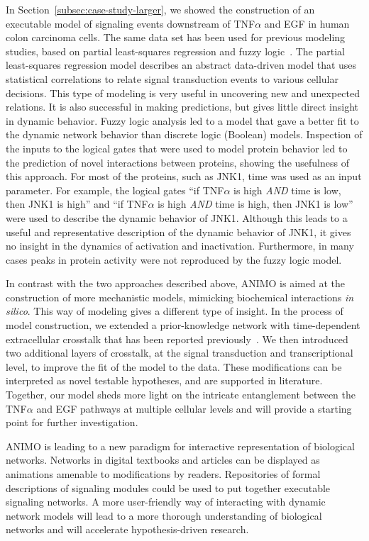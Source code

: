 In Section~\ref{subsec:case-study-larger}, we showed the construction of an executable model
of signaling events downstream of
TNF$\alpha$ and EGF in human colon carcinoma cells. The same data set has been used for
previous modeling studies, based on partial least-squares regression and fuzzy logic~\citep{pathway-leastsquare,pathway-fuzzy}.
The partial least-squares regression model describes an abstract data-driven model that uses statistical correlations
to relate signal transduction events to various cellular decisions. This type of modeling is
very useful in uncovering new and unexpected relations. It is also successful in making
predictions, but gives little direct insight in dynamic behavior. Fuzzy
logic analysis led to a model that gave a better fit to the dynamic network behavior than
discrete logic (Boolean) models. Inspection of the inputs to the logical gates that were used
to model protein behavior led to the prediction of novel interactions between proteins,
showing the usefulness of this approach. For most of the proteins, such as JNK1, time was
used as an input parameter. For example, the logical gates ``if TNF$\alpha$ is high
\emph{AND} time is low, then JNK1 is high'' and ``if TNF$\alpha$ is high \emph{AND} time is
high, then JNK1 is low'' were used to
describe the dynamic behavior of JNK1. Although this leads to a useful and representative
description of the dynamic behavior of JNK1, it gives no insight in the dynamics
of activation and inactivation. Furthermore, in many cases peaks in protein activity were
not reproduced by the fuzzy logic model.

In contrast with the two approaches described above, ANIMO is aimed at the construction of
more mechanistic models, mimicking biochemical interactions \emph{in silico}. This way of modeling
gives a different type of insight. In the process of model construction, we extended a
prior-knowledge network with time-dependent extracellular crosstalk that has been reported
previously~\citep{pathway-autocrine}. We then introduced two additional layers of
crosstalk, at the signal transduction and transcriptional level, to
improve the fit of the model to the data. These modifications can be interpreted as novel testable hypotheses,
and are supported in literature.
Together, our model sheds more light on the intricate
entanglement between the TNF$\alpha$ and EGF pathways at multiple cellular levels and will
provide a starting point for further investigation.

ANIMO is leading to a new paradigm for interactive
representation of biological networks. Networks in digital textbooks and articles can be
displayed as animations amenable to modifications by readers. Repositories of formal
descriptions of signaling modules could be used to put together executable signaling
networks. A more user-friendly way of interacting with dynamic network models will lead to a
more thorough understanding of biological networks and will accelerate hypothesis-driven
research.
